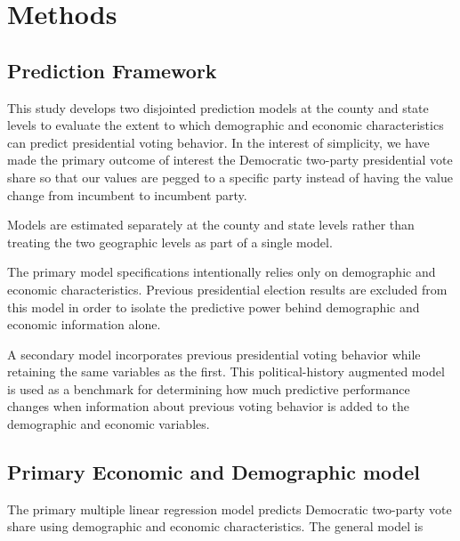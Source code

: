 \documentclass[12pt]{article}
\begin{document}
	
	
	
	\section{Methods}
	
	\subsection{Prediction Framework}
	
	This study develops two disjointed prediction models at the county and state
	levels to evaluate the extent to which demographic and economic
	characteristics can predict presidential voting behavior. In the interest of simplicity, we have made the primary
	outcome of interest the Democratic two-party presidential vote share so that our values are pegged to a specific party instead of having the value change from incumbent to incumbent party.
	
	Models are estimated separately at the county and state levels rather
	than treating the two geographic levels as part of a single model.
	
	The primary model specifications intentionally relies only on demographic
	and economic characteristics. Previous presidential election results
	are excluded from this model in order to isolate the predictive power behind demographic and economic information alone.
	
	A secondary model incorporates previous presidential voting
	behavior while retaining the same variables as the first. This political-history augmented model is used as a benchmark
	for determining how much predictive performance changes when information
	about previous voting behavior is added to the demographic and economic
	variables.
	
	\subsection{Primary Economic and Demographic model}
	
	The primary multiple linear regression model predicts Democratic
	two-party vote share using demographic and economic characteristics.
	The general model is
	
\end{document}
